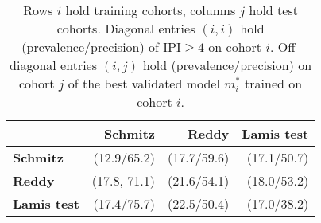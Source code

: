 \begin{table}[ht]
    \small
    \centering
    \begin{tabular}{lrrr}
        \hline
        & \textbf{Schmitz} & \textbf{Reddy} & \textbf{Lamis test} \\
        \hline
        \textbf{Schmitz} & (\num{12.9}/\num{65.2}) & (\num{17.7}/\num{59.6}) & (\num{17.1}/\num{50.7}) \\
        \textbf{Reddy} & (\num{17.8}, \num{71.1}) & (\num{21.6}/\num{54.1}) & (\num{18.0}/\num{53.2}) \\
        \textbf{Lamis test} & (\num{17.4}/\num{75.7}) & (\num{22.5}/\num{50.4}) & (\num{17.0}/\num{38.2}) \\       \hline
    \end{tabular}
    \caption{Rows $i$ hold training cohorts, columns $j$ hold test cohorts. Diagonal 
        entries $(i, i)$ hold (prevalence/precision) of $\text{IPI} \geq 4$
        on cohort $i$. Off-diagonal entries $(i, j)$ hold (prevalence/precision) 
        on cohort $j$ of the best validated model $m^*_i$ trained on cohort $i$.}
    \label{tab:inter_trial}
\end{table}